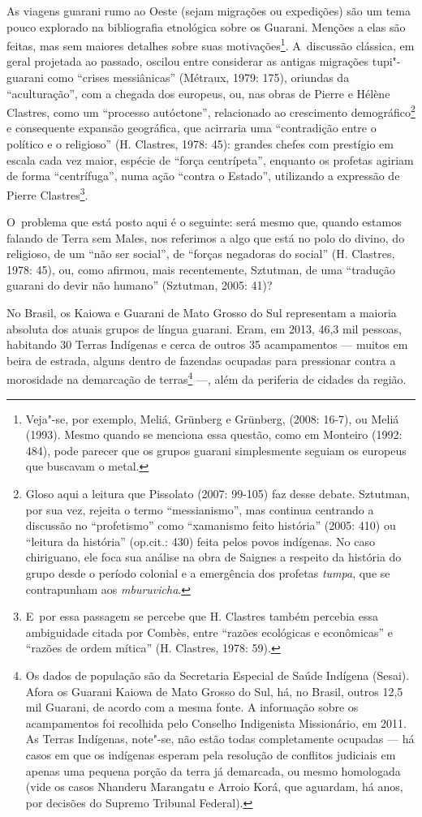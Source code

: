 As viagens guarani rumo ao Oeste (sejam migrações ou expedições) são um
tema pouco explorado na bibliografia etnológica sobre os Guarani.
Menções a elas são feitas, mas sem maiores detalhes sobre suas
motivações\footnote{Veja"-se, por exemplo, Meliá, Grünberg e Grünberg,
(2008: 16-7), ou Meliá (1993). Mesmo quando se menciona essa questão,
como em Monteiro (1992: 484), pode parecer que os grupos guarani
simplesmente seguiam os europeus que buscavam o metal. }. A~discussão
clássica, em geral projetada ao passado, oscilou entre considerar as
antigas migrações tupi"-guarani como ``crises messiânicas'' (Métraux,
1979: 175), oriundas da ``aculturação'', com a chegada dos europeus, ou,
nas obras de Pierre e Hélène Clastres, como um ``processo autóctone'',
relacionado ao crescimento demográfico\footnote{Gloso aqui a leitura
que Pissolato (2007: 99-105) faz desse debate. Sztutman, por sua vez,
rejeita o termo ``messianismo'', mas continua centrando a discussão no
``profetismo'' como ``xamanismo feito história'' (2005: 410) ou ``leitura da
história'' (op.cit.: 430) feita pelos povos indígenas. No caso
chiriguano, ele foca sua análise na obra de Saignes a respeito da
história do grupo desde o período colonial e a emergência dos profetas
\emph{tumpa}, que se contrapunham aos \emph{mburuvicha}.} e consequente expansão
geográfica, que acirraria uma ``contradição entre o político e o
religioso'' (H. Clastres, 1978: 45): grandes chefes com prestígio em
escala cada vez maior, espécie de ``força centrípeta'', enquanto os
profetas agiriam de forma ``centrífuga'', numa ação ``contra o Estado'',
utilizando a expressão de Pierre Clastres\footnote{E~por essa passagem
se percebe que H. Clastres também percebia essa ambiguidade citada por
Combès, entre ``razões ecológicas e econômicas'' e ``razões de ordem
mítica'' (H. Clastres, 1978: 59).}.

O~problema que está posto aqui é o seguinte: será mesmo que, quando
estamos falando de Terra sem Males, nos referimos a algo que está no
polo do divino, do religioso, de um ``não ser social'', de ``forças
negadoras do social'' (H. Clastres, 1978: 45), ou, como afirmou, mais
recentemente, Sztutman, de uma ``tradução guarani do devir não humano''
(Sztutman, 2005: 41)?

No Brasil, os Kaiowa e Guarani de Mato Grosso do Sul representam a
maioria absoluta dos atuais grupos de língua guarani. Eram, em 2013,
46,3 mil pessoas, habitando 30 Terras Indígenas e cerca de outros 35
acampamentos --- muitos em beira de estrada, alguns dentro de fazendas
ocupadas para pressionar contra a morosidade na demarcação de
terras\footnote{Os dados de população são da Secretaria Especial de
Saúde Indígena (Sesai). Afora os Guarani Kaiowa de Mato Grosso do Sul,
há, no Brasil, outros 12,5 mil Guarani, de acordo com a mesma fonte. A
informação sobre os acampamentos foi recolhida pelo Conselho
Indigenista Missionário, em 2011. As Terras Indígenas, note"-se, não
estão todas completamente ocupadas --- há casos em que os indígenas
esperam pela resolução de conflitos judiciais em apenas uma pequena
porção da terra já demarcada, ou mesmo homologada (vide os casos
Nhanderu Marangatu e Arroio Korá, que aguardam, há anos, por decisões
do Supremo Tribunal Federal).} ---, além da periferia de cidades da
região.

